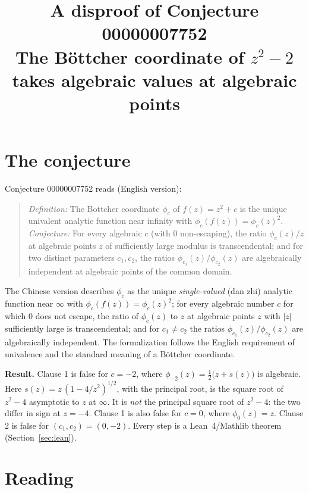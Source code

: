 \documentclass[11pt]{article}
\title{A disproof of Conjecture 00000007752\\[2pt]
\large The B\"ottcher coordinate of $z^2-2$ takes algebraic values at algebraic points}
\date{}
\theoremstyle{definition}
\theoremstyle{remark}
\renewcommand{\_}{\oldus\allowbreak}
\begin{document}
\sloppy
\maketitle

\section{The conjecture}

Conjecture 00000007752 reads (English version):
\begin{quote}
\emph{Definition:} The Bottcher coordinate $\phi_c$ of $f(z)=z^2+c$ is the unique univalent analytic
function near infinity with $\phi_c(f(z)) = \phi_c(z)^2$. \emph{Conjecture:} For every algebraic $c$
(with $0$ non-escaping), the ratio $\phi_c(z)/z$ at algebraic points $z$ of sufficiently large modulus
is transcendental; and for two distinct parameters $c_1, c_2$, the ratios
$\phi_{c_1}(z)/\phi_{c_2}(z)$ are algebraically independent at algebraic points of the common domain.
\end{quote}
The Chinese version describes $\phi_c$ as the unique \emph{single-valued} (dan zhi) analytic function
near $\infty$ with $\phi_c(f(z))=\phi_c(z)^2$; for every algebraic number $c$ for which $0$ does not
escape, the ratio of $\phi_c(z)$ to $z$ at algebraic points $z$ with $|z|$ sufficiently large is
transcendental; and for $c_1\ne c_2$ the ratios $\phi_{c_1}(z)/\phi_{c_2}(z)$ are algebraically
independent. The formalization follows the English requirement of univalence and the standard meaning
of a B\"ottcher coordinate.

\textbf{Result.} Clause 1 is false for $c=-2$, where
$\phi_{-2}(z)=\tfrac12\bigl(z+s(z)\bigr)$ is algebraic. Here $s(z)=z\,(1-4/z^2)^{1/2}$, with the principal
root, is the square root of $z^2-4$ asymptotic to $z$ at $\infty$. It is \emph{not} the principal square
root of $z^2-4$: the two differ in sign at $z=-4$. Clause 1 is also false for $c=0$, where $\phi_0(z)=z$.
Clause 2 is false for $(c_1,c_2)=(0,-2)$. Every step is a Lean~4/Mathlib theorem (Section~\ref{sec:lean}).

\section{Reading}\label{sec:reading}
\end{document}
